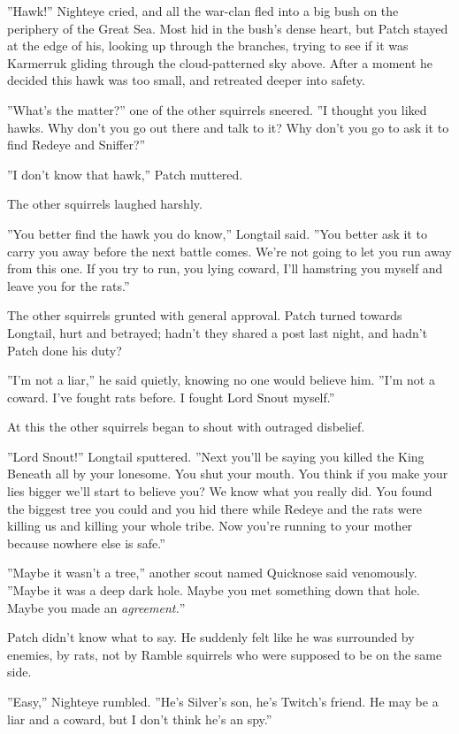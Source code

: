 \documentclass[12pt]{book}
\begin{document}
 ''Hawk!'' Nighteye cried, and all the war-clan fled into a big bush on the periphery of the Great Sea. Most hid in the bush's dense heart, but Patch stayed at the edge of his, looking up through the branches, trying to see if it was Karmerruk gliding through the cloud-patterned sky above. After a moment he decided this hawk was too small, and retreated deeper into safety.\par
 ''What's the matter?'' one of the other squirrels sneered. ''I thought you liked hawks. Why don't you go out there and talk to it? Why don't you go to ask it to find Redeye and Sniffer?''\par
 ''I don't know that hawk,'' Patch muttered.\par
 The other squirrels laughed harshly.\par
 ''You better find the hawk you do know,'' Longtail said. ''You better ask it to carry you away before the next battle comes. We're not going to let you run away from this one. If you try to run, you lying coward, I'll hamstring you myself and leave you for the rats.''\par
 The other squirrels grunted with general approval. Patch turned towards Longtail, hurt and betrayed; hadn't they shared a post last night, and hadn't Patch done his duty?\par
 ''I'm not a liar,'' he said quietly, knowing no one would believe him. ''I'm not a coward. I've fought rats before. I fought Lord Snout myself.''\par
 At this the other squirrels began to shout with outraged disbelief.\par
 ''Lord Snout!'' Longtail sputtered. ''Next you'll be saying you killed the King Beneath all by your lonesome. You shut your mouth. You think if you make your lies bigger we'll start to believe you? We know what you really did. You found the biggest tree you could and you hid there while Redeye and the rats were killing us and killing your whole tribe. Now you're running to your mother because nowhere else is safe.''\par
 ''Maybe it wasn't a tree,'' another scout named Quicknose said venomously. ''Maybe it was a deep dark hole. Maybe you met something down that hole. Maybe you made an {\it agreement.}''\par
 Patch didn't know what to say. He suddenly felt like he was surrounded by enemies, by rats, not by Ramble squirrels who were supposed to be on the same side.\par
 ''Easy,'' Nighteye rumbled. ''He's Silver's son, he's Twitch's friend. He may be a liar and a coward, but I don't think he's an spy.''\par
\end{document}
